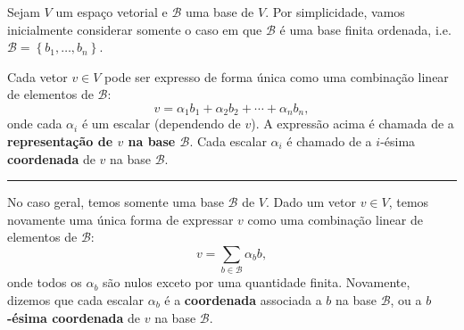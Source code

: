 \begin{definition}
	Sejam $V$ um espaço vetorial e $\mathcal{B}$ uma base de $V$. Por simplicidade, vamos inicialmente considerar somente o caso em que $\mathcal{B}$ é uma base finita ordenada, i.e. $\mathcal{B}=\left\{b_1,\ldots,b_n\right\}$.
	
	Cada vetor $v\in V$ pode ser expresso de forma única como uma combinação linear de elementos de $\mathcal{B}$:
	\[
		v=\alpha_1b_1+\alpha_2b_2+\cdots+\alpha_nb_n,
		\]
	onde cada $\alpha_i$ é um escalar (dependendo de $v$). A expressão acima é chamada de a \textbf{representação de $v$ na base $\mathcal{B}$}. Cada escalar $\alpha_i$ é chamado de a $i$-ésima \textbf{coordenada} de $v$ na base $\mathcal{B}$.
	
	\hrule
	
	No caso geral, temos somente uma base $\mathcal{B}$ de $V$. Dado um vetor $v\in V$, temos novamente uma única forma de expressar $v$ como uma combinação linear de elementos de $\mathcal{B}$:
	\[
		v=\sum_{b\in\mathcal{B}}\alpha_b b,
		\]
	onde todos os $\alpha_b$ são nulos exceto por uma quantidade finita. Novamente, dizemos que cada escalar $\alpha_b$ é a \textbf{coordenada} associada a $b$ na base $\mathcal{B}$, ou a \textbf{$b$-ésima coordenada} de $v$ na base $\mathcal{B}$.
\end{definition}